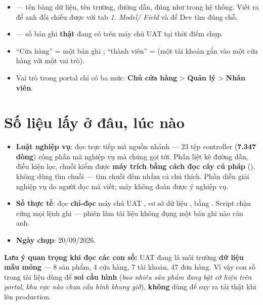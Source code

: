 \begin{itemize}[leftmargin=*]
  \item {} --- tên bảng dữ liệu, tên trường, đường dẫn, đúng như trong hệ thống. Viết
        ra để anh đối chiếu được với tab \emph{1. Model/ Field} và để Dev tìm đúng chỗ.
  \item {} --- số bản ghi \textbf{thật} đang có trên máy chủ UAT tại thời điểm chụp.
  \item ``Cửa hàng'' = một bản ghi ; ``thành viên'' =
         (một tài khoản gắn vào một cửa hàng với một vai trò).
  \item Vai trò trong portal chỉ có ba mức: \textbf{Chủ cửa hàng} > \textbf{Quản lý} >
        \textbf{Nhân viên}.
\end{itemize}

\section{Số liệu lấy ở đâu, lúc nào}

\begin{itemize}[leftmargin=*]
  \item \textbf{Luật nghiệp vụ}: đọc trực tiếp mã nguồn nhánh  --- 23 tệp controller
        (\textbf{7.347 dòng}) cộng phần mã nghiệp vụ mà chúng gọi tới. Phần liệt kê đường dẫn,
        điều kiện lọc, chuỗi kiểm được \textbf{máy trích bằng cách đọc cây cú pháp}
        (), không dùng tìm chuỗi --- tìm chuỗi đếm nhầm cả
        chú thích. Phần diễn giải nghiệp vụ do người đọc mã viết; máy không đoán được ý nghiệp vụ.
  \item \textbf{Số thực tế}: đọc \textbf{chỉ-đọc} máy chủ UAT , cơ sở
        dữ liệu , bằng . Script chặn cứng
        mọi lệnh ghi --- phiên làm tài liệu không đụng một bản ghi nào của anh.
  \item \textbf{Ngày chụp}: 20/09/2026.
\end{itemize}

\begin{ask}
\textbf{Lưu ý quan trọng khi đọc các con số:} UAT đang là môi trường \textbf{dữ liệu mẫu mỏng}
--- 8 sản phẩm, 4 cửa hàng, 7 tài khoản, 47 đơn hàng. Vì vậy con số trong tài liệu dùng để
\textbf{soi cấu hình} (\emph{bao nhiêu sản phẩm đang bật cờ hiện trên portal}, \emph{khu vực nào
chưa cấu hình khung giờ}), \textbf{không} dùng để suy ra tải thật khi lên production.
\end{ask}

